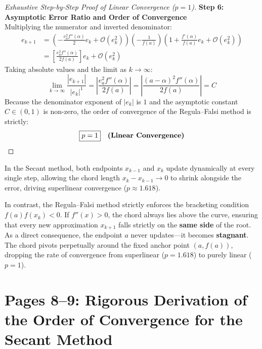 \begin{proof}[Exhaustive Step-by-Step Proof of Linear Convergence ($p = 1$)]
\noindent\textbf{Step 6: Asymptotic Error Ratio and Order of Convergence} \\
Multiplying the numerator and inverted denominator:
\begin{align}
    e_{k+1} &= \left( -\frac{e_a^2 f''(\alpha)}{2} e_k + \mathcal{O}(e_k^2) \right) \left( -\frac{1}{f(a)} \right) \left( 1 + \frac{f'(\alpha)}{f(a)} e_k + \mathcal{O}(e_k^2) \right) \nonumber \\
    &= \left[ \frac{e_a^2 f''(\alpha)}{2 f(a)} \right] e_k + \mathcal{O}(e_k^2)
\end{align}
Taking absolute values and the limit as $k \to \infty$:
\begin{equation}
    \lim_{k \to \infty} \frac{|e_{k+1}|}{|e_k|^1} = \left| \frac{e_a^2 f''(\alpha)}{2 f(a)} \right| = \left| \frac{(a - \alpha)^2 f''(\alpha)}{2 f(a)} \right| = C
\end{equation}
Because the denominator exponent of $|e_k|$ is $1$ and the asymptotic constant $C \in (0, 1)$ is non-zero, the order of convergence of the Regula--Falsi method is strictly:
\begin{equation}
    \boxed{p = 1} \quad \text{\textbf{(Linear Convergence)}}
\end{equation}
\end{proof}

\begin{notebox}
In the Secant method, both endpoints $x_{k-1}$ and $x_k$ update dynamically at every single step, allowing the chord length $x_k - x_{k-1} \to 0$ to shrink alongside the error, driving superlinear convergence ($p \approx 1.618$).

In contrast, the Regula--Falsi method strictly enforces the bracketing condition $f(a) f(x_k) < 0$. If $f''(x) > 0$, the chord always lies above the curve, ensuring that every new approximation $x_{k+1}$ falls strictly on the \textbf{same side} of the root. As a direct consequence, the endpoint $a$ never updates—it becomes \textbf{stagnant}. The chord pivots perpetually around the fixed anchor point $(a, f(a))$, dropping the rate of convergence from superlinear ($p = 1.618$) to purely linear ($p = 1$).
\end{notebox}

\section{Pages 8--9: Rigorous Derivation of the Order of Convergence for the Secant Method}
\label{sec:page8_9_secant_convergence}

